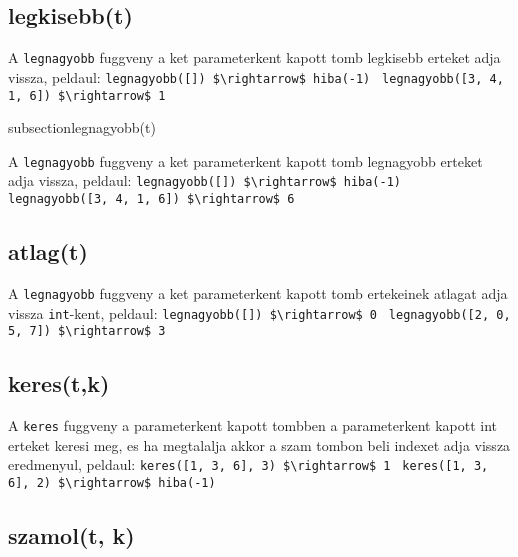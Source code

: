 \documentclass{article}
\begin{document}
\subsection{legkisebb(t)}

A \lstinline{legnagyobb} fuggveny a ket parameterkent kapott tomb legkisebb erteket adja vissza, peldaul:\newline
\lstinline[mathescape]{legnagyobb([]) $\rightarrow$ hiba(-1) }\newline
\lstinline[mathescape]{legnagyobb([3, 4, 1, 6]) $\rightarrow$ 1 }\newline

subsection{legnagyobb(t)}

A \lstinline{legnagyobb} fuggveny a ket parameterkent kapott tomb legnagyobb erteket adja vissza, peldaul:\newline
\lstinline[mathescape]{legnagyobb([]) $\rightarrow$ hiba(-1) }\newline
\lstinline[mathescape]{legnagyobb([3, 4, 1, 6]) $\rightarrow$ 6 }\newline

\subsection{atlag(t)}

A \lstinline{legnagyobb} fuggveny a ket parameterkent kapott tomb ertekeinek atlagat adja vissza \lstinline{int}-kent, peldaul:\newline
\lstinline[mathescape]{legnagyobb([]) $\rightarrow$ 0 }\newline
\lstinline[mathescape]{legnagyobb([2, 0, 5, 7]) $\rightarrow$ 3 }\newline

\subsection{keres(t,k)}

A \lstinline{keres} fuggveny a parameterkent kapott tombben a parameterkent kapott int erteket keresi meg, es ha megtalalja akkor
a szam tombon beli indexet adja vissza eredmenyul, peldaul:\newline
\lstinline[mathescape]{keres([1, 3, 6], 3) $\rightarrow$ 1 }\newline
\lstinline[mathescape]{keres([1, 3, 6], 2) $\rightarrow$ hiba(-1) }\newline

\subsection{szamol(t, k)}
\end{document}
